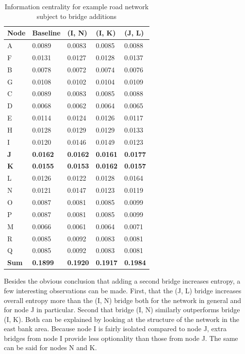 \begin{table}[H]
	\centering
	\caption{Information centrality for example road network subject to bridge additions}
	\label{tab:bridge_information_centrality}
	\begin{tabular}{|C{.2\linewidth}|C{.2\linewidth}|C{.2\linewidth}|C{.2\linewidth}|C{.2\linewidth}|}
		\hline Node & Baseline & (I, N) & (I, K) & (J, L) \\
		\hline A & 0.0089 & 0.0083 & 0.0085 & 0.0088 \\
		\hline F & 0.0131 & 0.0127 & 0.0128 & 0.0137 \\
		\hline B & 0.0078 & 0.0072 & 0.0074 & 0.0076 \\
		\hline G & 0.0108 & 0.0102 & 0.0104 & 0.0109 \\
		\hline C & 0.0089 & 0.0083 & 0.0085 & 0.0088 \\
		\hline D & 0.0068 & 0.0062 & 0.0064 & 0.0065 \\
		\hline E & 0.0114 & 0.0124 & 0.0126 & 0.0117 \\
		\hline H & 0.0128 & 0.0129 & 0.0129 & 0.0133 \\
		\hline I & 0.0120 & 0.0146 & 0.0149 & 0.0123 \\
		\hline \textbf{J} & \textbf{0.0162} & \textbf{0.0162} & \textbf{0.0161} & \textbf{0.0177} \\
		\hline \textbf{K} & \textbf{0.0155} & \textbf{0.0153} & \textbf{0.0162} & \textbf{0.0157} \\
		\hline L & 0.0126 & 0.0122 & 0.0128 & 0.0164 \\
		\hline N & 0.0121 & 0.0147 & 0.0123 & 0.0119 \\
		\hline O & 0.0087 & 0.0081 & 0.0085 & 0.0099 \\
		\hline P & 0.0087 & 0.0081 & 0.0085 & 0.0099 \\
		\hline M & 0.0066 & 0.0061 & 0.0064 & 0.0071 \\
		\hline R & 0.0085 & 0.0092 & 0.0083 & 0.0081 \\
		\hline Q & 0.0085 & 0.0092 & 0.0083 & 0.0081 \\
		\hline \textbf{Sum} & \textbf{0.1899} & \textbf{0.1920} & \textbf{0.1917} & \textbf{0.1984} \\
		\hline
	\end{tabular}
\end{table}

Besides the obvious conclusion that adding a second bridge increases entropy, a few interesting observations can be made. First, that the (J, L) bridge increases overall entropy more than the (I, N) bridge both for the network in general and for node J in particular. Second that bridge (I, N) similarly outperforms bridge (I, K). Both can be explained by looking at the structure of the network in the east bank area. Because node I is fairly isolated compared to node J, extra bridges from node I provide less optionality than those from node J. The same can be said for nodes N and K.

